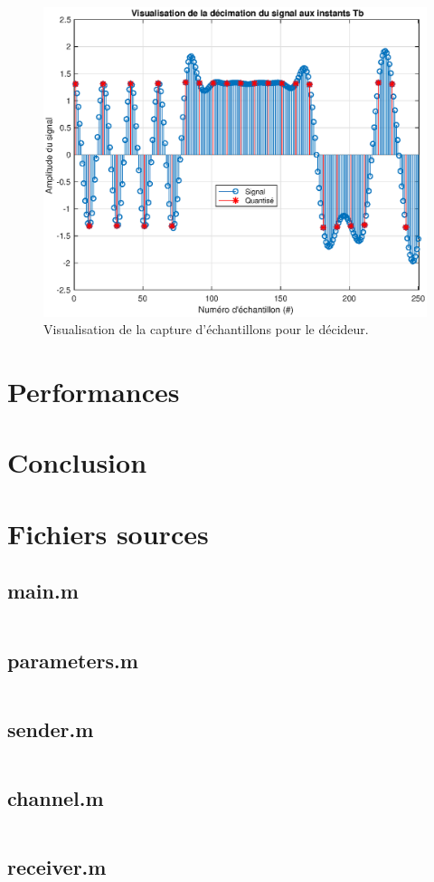 \documentclass[10pt, oneside, a4paper]{article}
\begin{document}
\begin{figure}[htbp]
	\centering
	\includegraphics[height=0.45\textheight]{eps/decimate.eps}
	\caption{Visualisation de la capture d'échantillons pour le décideur.}
	\label{fig:decimate}
\end{figure}


\section{Performances}


\section{Conclusion}

\appendix
\clearpage

\section{Fichiers sources}
\label{sec:fichiers-sources}

\subsection{main.m}
\inputminted{matlab}{../main.m}
\label{app:main}

\subsection{parameters.m}
\inputminted{matlab}{../parameters.m}
\label{app:paremeters}

\subsection{sender.m}
\inputminted{matlab}{../sender.m}
\label{app:sender}

\subsection{channel.m}
\inputminted{matlab}{../channel.m}
\label{app:channel}

\subsection{receiver.m}
\inputminted{matlab}{../receiver.m}
\label{app:receiver}
\end{document}
